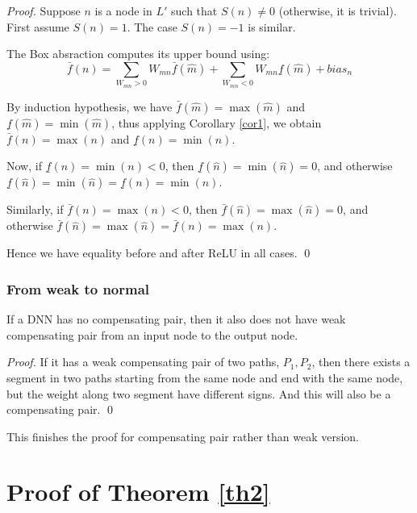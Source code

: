 	\begin{proof}
		Suppose $n$ is a node in $L'$ such that $S(n)\neq 0$ (otherwise, it is trivial). 
		First assume $S(n)=1$. The case $S(n)=-1$ is similar. 
		
		The Box absraction computes its upper bound using:
		$$\bar{f}(n)= \sum_{W_{mn}>0} W_{mn} \bar{f}(\hat{m}) + \sum_{W_{mn}<0} W_{mn} \underline{f}(\hat{m}) + bias_n$$
		
		By induction hypothesis, we have 
		$\bar{f}(\hat{m})=\max(\hat{m})$ and
		$\underline{f}(\hat{m})=\min(\hat{m})$, thus 
		applying Corollary \ref{cor1}, we obtain
		$\bar{f}(n)=\max(n)$ and 
		$\underline{f}(n)=\min(n)$.
		
		Now, if $\underline{f}(n)=\min(n)<0$, 
		then $\underline{f}(\hat{n})=\min(\hat{n})=0$, 
		and otherwise 
		$\underline{f}(\hat{n})=\min(\hat{n})=\underline{f}(n)=\min(n)$.
		
		Similarly, 
		if $\bar{f}(n)=\max(n)<0$, 
		then $\bar{f}(\hat{n})=\max(\hat{n})=0$, 
		and otherwise 
		$\bar{f}(\hat{n})=\max(\hat{n})=\bar{f}(n)=\max(n)$.
		
		Hence we have equality before and after ReLU in all cases. \qed
	\end{proof}
	
	
	
	\subsubsection*{From weak to normal}
	
	\begin{lemma}
		If a DNN has no compensating pair, then it also does not have weak compensating pair from an input node to the output node.
	\end{lemma}
	
	\begin{proof}
		If it has a weak compensating pair of two paths, $P_1,P_2$, then there exists a segment in two paths starting from the same node and end with the same node, but the weight along two segment have different signs. And this will also be a compensating pair. \qed
	\end{proof}
	
	This finishes the proof for compensating pair rather than weak version.
	
	

			
			
			\section{Proof of Theorem \ref{th2}}
			

